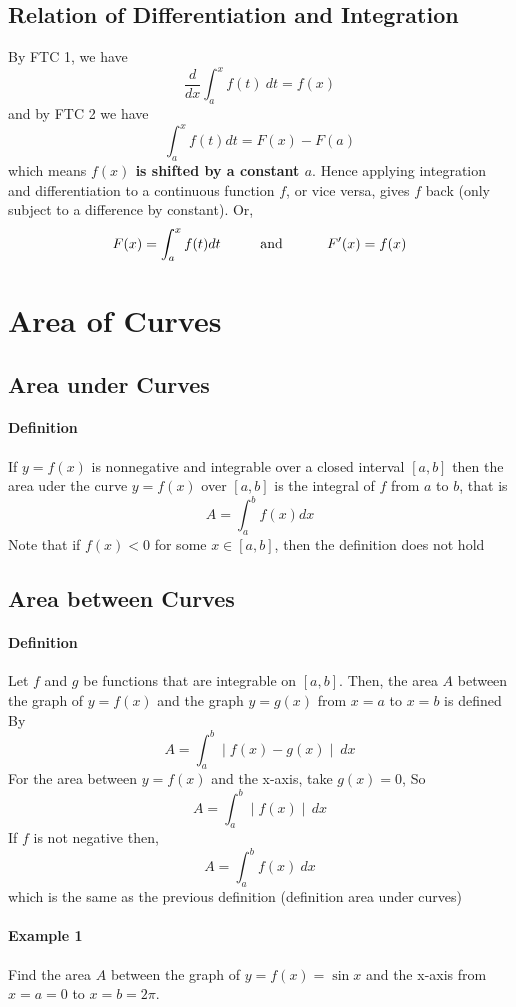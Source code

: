 \documentclass[12pt]{article}
\newcommand\tab[1][1cm]{\hspace*{#1}}
\begin{document}
\subsection{Relation of Differentiation and Integration}
By FTC 1, we have
\[
    \frac{d}{dx} \int_a^x f(t)\: dt = f(x)
\]
and by FTC 2 we have
\[
  \int_a^x f(t) dt = F(x) - F(a)  
\]
which means \textbf{$f(x)$ is shifted by a constant $a$}.
Hence applying integration and differentiation to a continuous function $f$, or vice versa, gives $f$ back (only subject to a difference by constant). Or,
\[
    F(x) = \int_a^x f(t) dt \textrm{\tab and \tab} F'(x) = f(x)
\]

\section{Area of Curves}
\subsection{Area under Curves}
\paragraph{Definition} If $y = f(x)$ is nonnegative and integrable over a closed interval $[a, b]$ then the area uder the curve
$y = f(x)$ over $[a, b]$ is the integral of $f$ from $a$ to $b$, that is 
\[
    A = \int_{a}^{b} f(x) dx
\]
Note that if $f(x) < 0$ for some $x \in [a, b]$, then the definition does not hold
\subsection{Area between Curves}
\paragraph{Definition} Let $f$ and $g$ be functions that are integrable on $[a, b]$. Then, the area $A$ between the graph of $y = f(x)$ and the graph $y = g(x)$
from $x = a$ to $x = b$ is defined By
\[
    A = \int_a^b \mid f(x) - g(x) \mid\: dx
\]
For the area between $y = f(x)$ and the x-axis, take $g(x) = 0$, So
\[
    A = \int_a^b \mid f(x) \mid\, dx
\]
If $f$ is not negative then, 
\[
    A = \int_a^b f(x)\: dx
\]
which is the same as the previous definition (definition area under curves)

\paragraph{Example 1} Find the area $A$ between the graph of $y = f(x) = \sin x$ and the x-axis from $x = a = 0$ to $x = b = 2 \pi$.
\end{document}
